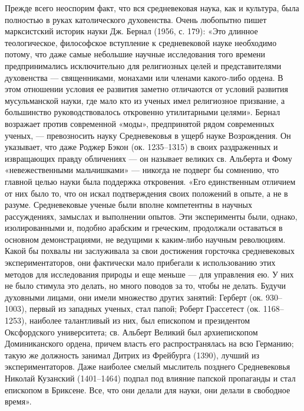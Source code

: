 Прежде  всего  неоспорим факт,  что  вся  средневековая наука,  как  и
культура,  была полностью  в  руках  католического духовенства.  Очень
любопытно пишет марксистский историк науки  Дж. Бернал (1956, с. 179):
«Это  длинное теологическое,  философское  вступление к  средневековой
науке необходимо потому, что даже самые небольшие научные исследования
того  времени предпринимались  исключительно для  религиозных целей  и
представителями  духовенства ---  священниками,  монахами или  членами
какого-либо  ордена.  В этом  отношении  условия  ее развития  заметно
отличаются от  условий развития мусульманской  науки, где мало  кто из
ученых  имел религиозное  призвание,  а большинство  руководствовалось
откровенно утилитарными  целями». Бернал возражает  против современной
«моды», предпринятой рядом современных  ученых, --- превозносить науку
Средневековья  в  ущерб  науке  Возрождения. Он  указывает,  что  даже
Роджер  Бэкон  (ок. 1235--1315)  в  своих  раздраженных и  извращающих
правду  обличениях  ---  он  называет  великих  св.  Альберта  и  Фому
«невежественными мальчишками» --- никогда  не подверг бы сомнению, что
главной  целью  науки  была поддержка  откровения.  «Его  единственным
отличием от них было то, что  он искал подтверждения своих положений в
опыте, а не  в разуме. Средневековые ученые были  вполне компетентны в
научных рассуждениях,  замыслах и выполнении опытов.  Эти эксперименты
были,  однако,   изолированными  и,  подобно  арабским   и  греческим,
продолжали  оставаться  в  основном   демонстрациями,  не  ведущими  к
каким-либо научным революциям. Какой бы похвалы ни заслуживала за свои
достижения горсточка  средневековых экспериментаторов,  они фактически
мало прибегали к использованию этих методов для исследования природы и
еще  меньше  ---  для  управления  ею.  У  них  не  было  стимула  это
делать,  но много  поводов за  то, чтобы  не делать.  Будучи духовными
лицами, они  имели множество других занятий:  Герберт (ок. 930--1003),
первый  из  западных  ученых,   стал  папой;  Роберт  Грассетест  (ок.
1168--1253), наиболее талантливый из  них, был епископом и президентом
Оксфордского  университета;  св.  Альберт  Великий  был  архиепископом
Доминиканского  ордена,  причем  власть его  распространялась  на  всю
Германию;  такую  же должность  занимал  Дитрих  из Фрейбурга  (1390),
лучший из  экспериментаторов. Даже наиболее смелый  мыслитель позднего
Средневековья  Николай  Кузанский   (1401--1464)  подпал  под  влияние
папской пропаганды  и стал епископом  в Бриксене. Все, что  они делали
для науки, они делали в свободное время».

